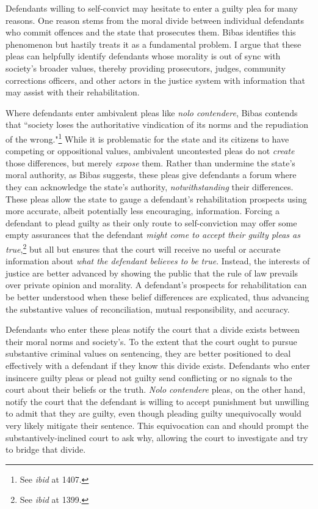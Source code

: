 Defendants willing to self-convict may hesitate to enter a guilty plea for many reasons. One reason stems from the moral divide between individual defendants who commit offences and the state that prosecutes them. Bibas identifies this phenomenon but hastily treats it as a fundamental problem. I argue that these pleas can helpfully identify defendants whose morality is out of sync with society's broader values, thereby providing prosecutors, judges, community corrections officers, and other actors in the justice system with information that may assist with their rehabilitation.

Where defendants enter ambivalent pleas like \textit{nolo contendere}, Bibas contends that ``society loses the authoritative vindication of its norms and the repudiation of the wrong."\footnote{See \textit{ibid} at 1407.} While it is problematic for the state and its citizens to have competing or oppositional values, ambivalent uncontested pleas do not \textit{create} those differences, but merely \textit{expose} them. Rather than undermine the state's moral authority, as Bibas suggests, these pleas give defendants a forum where they can acknowledge the state's authority, \textit{notwithstanding} their differences. These pleas allow the state to gauge a defendant's rehabilitation prospects using more accurate, albeit potentially less encouraging, information. Forcing a defendant to plead guilty as their only route to self-conviction may offer some empty assurances that the defendant \textit{might come to accept their guilty pleas as true},\footnote{See \textit{ibid} at 1399.} but all but ensures that the court will receive no useful or accurate information about \textit{what the defendant believes to be true}. Instead, the interests of justice are better advanced by showing the public that the rule of law prevails over private opinion and morality. A defendant's prospects for rehabilitation can be better understood when these belief differences are explicated, thus advancing the substantive values of reconciliation, mutual responsibility, and accuracy.

Defendants who enter these pleas notify the court that a divide exists between their moral norms and society's. To the extent that the court ought to pursue substantive criminal values on sentencing, they are better positioned to deal effectively with a defendant if they know this divide exists. Defendants who enter insincere guilty pleas or plead not guilty send conflicting or no signals to the court about their beliefs or the truth. \textit{Nolo contendere} pleas, on the other hand, notify the court that the defendant is willing to accept punishment but unwilling to admit that they are guilty, even though pleading guilty unequivocally would very likely mitigate their sentence. This equivocation can and should prompt the substantively-inclined court to ask why, allowing the court to investigate and try to bridge that divide. 

